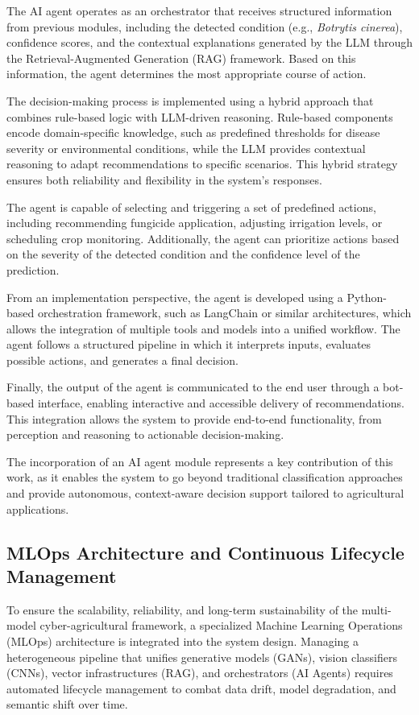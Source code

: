 \documentclass[11pt]{article}
\begin{document}
The AI agent operates as an orchestrator that receives structured information from previous modules, including the detected condition (e.g., \textit{Botrytis cinerea}), confidence scores, and the contextual explanations generated by the LLM through the Retrieval-Augmented Generation (RAG) framework. Based on this information, the agent determines the most appropriate course of action.

The decision-making process is implemented using a hybrid approach that combines rule-based logic with LLM-driven reasoning. Rule-based components encode domain-specific knowledge, such as predefined thresholds for disease severity or environmental conditions, while the LLM provides contextual reasoning to adapt recommendations to specific scenarios. This hybrid strategy ensures both reliability and flexibility in the system's responses.

The agent is capable of selecting and triggering a set of predefined actions, including recommending fungicide application, adjusting irrigation levels, or scheduling crop monitoring. Additionally, the agent can prioritize actions based on the severity of the detected condition and the confidence level of the prediction.

From an implementation perspective, the agent is developed using a Python-based orchestration framework, such as LangChain or similar architectures, which allows the integration of multiple tools and models into a unified workflow. The agent follows a structured pipeline in which it interprets inputs, evaluates possible actions, and generates a final decision.

Finally, the output of the agent is communicated to the end user through a bot-based interface, enabling interactive and accessible delivery of recommendations. This integration allows the system to provide end-to-end functionality, from perception and reasoning to actionable decision-making.

The incorporation of an AI agent module represents a key contribution of this work, as it enables the system to go beyond traditional classification approaches and provide autonomous, context-aware decision support tailored to agricultural applications.

\subsection{MLOps Architecture and Continuous Lifecycle Management}
To ensure the scalability, reliability, and long-term sustainability of the multi-model cyber-agricultural framework, a specialized Machine Learning Operations (MLOps) architecture is integrated into the system design. Managing a heterogeneous pipeline that unifies generative models (GANs), vision classifiers (CNNs), vector infrastructures (RAG), and orchestrators (AI Agents) requires automated lifecycle management to combat data drift, model degradation, and semantic shift over time.
\end{document}
